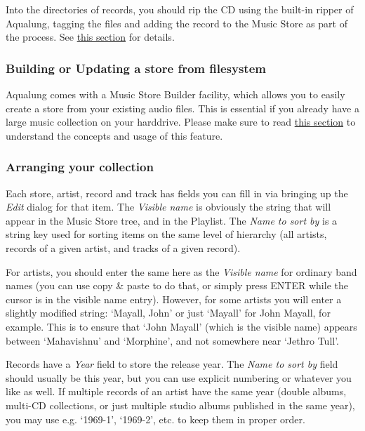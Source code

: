 \documentclass[10pt,english]{article}
\begin{document}
Into the directories of records, you should rip the CD
using the built-in ripper of Aqualung, tagging the files and
adding the record to the Music Store as part of the
process. See \hyperref[idp589520]{\color{blue}this section} for
details.




\subsubsection{Building or Updating a store from filesystem\label{idp198048}}



\noindent Aqualung comes with a Music Store Builder facility, which
allows you to easily create a store from your existing audio
files. This is essential if you already have a large music
collection on your harddrive. Please make sure to read \hyperref[idp663728]{\color{blue}this section} to understand the
concepts and usage of this feature.




\subsubsection{Arranging your collection\label{idp559328}}



\noindent Each store, artist, record and track has fields you can
fill in via bringing up the \textsl{Edit} dialog for that
item. The \textsl{Visible name} is obviously the string
that will appear in the Music Store tree, and in the
Playlist. The \textsl{Name to sort by} is a string key
used for sorting items on the same level of hierarchy (all
artists, records of a given artist, and tracks of a given
record).




For artists, you should enter the same here as the
\textsl{Visible name} for ordinary band names (you can use
copy \& paste to do that, or simply press ENTER while the
cursor is in the visible name entry). However, for some
artists you will enter a slightly modified string:
`Mayall, John' or just `Mayall' for John Mayall,
for example. This is to ensure that `John Mayall'
(which is the visible name) appears between
`Mahavishnu' and `Morphine', and not somewhere
near `Jethro Tull'.




Records have a \textsl{Year} field to store the release
year. The \textsl{Name to sort by} field should usually be
this year, but you can use explicit numbering or whatever
you like as well. If multiple records of an artist have the
same year (double albums, multi-CD collections, or just
multiple studio albums published in the same year), you may
use e.g. `1969-1', `1969-2', etc. to keep them in
proper order.
\end{document}
